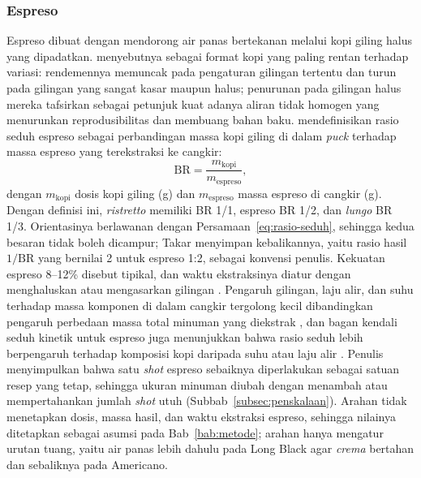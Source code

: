\subsubsection{Espreso}
\label{subsubsec:espreso}

Espreso dibuat dengan mendorong air panas bertekanan melalui kopi giling halus yang dipadatkan. \citet{cameron2020systematically} menyebutnya sebagai format kopi yang paling rentan terhadap variasi: rendemennya memuncak pada pengaturan gilingan tertentu dan turun pada gilingan yang sangat kasar maupun halus; penurunan pada gilingan halus mereka tafsirkan sebagai petunjuk kuat adanya aliran tidak homogen yang menurunkan reprodusibilitas dan membuang bahan baku. \citet*{schmieder2023influence} mendefinisikan rasio seduh espreso sebagai perbandingan massa kopi giling di dalam \textit{puck} terhadap massa espreso yang terekstraksi ke cangkir:
\begin{equation}
\mathrm{BR} = \frac{m_{\mathrm{kopi}}}{m_{\mathrm{espreso}}},
\label{eq:rasio-espreso}
\end{equation}
dengan $m_{\mathrm{kopi}}$ dosis kopi giling (g) dan $m_{\mathrm{espreso}}$ massa espreso di cangkir (g). Dengan definisi ini, \textit{ristretto} memiliki BR 1/1, espreso BR 1/2, dan \textit{lungo} BR 1/3. Orientasinya berlawanan dengan Persamaan~\eqref{eq:rasio-seduh}, sehingga kedua besaran tidak boleh dicampur; Takar menyimpan kebalikannya, yaitu rasio hasil $1/\mathrm{BR}$ yang bernilai 2 untuk espreso 1:2, sebagai konvensi penulis. Kekuatan espreso 8--12\% disebut tipikal, dan waktu ekstraksinya diatur dengan menghaluskan atau mengasarkan gilingan \citep{moroney2019analysing}. Pengaruh gilingan, laju alir, dan suhu terhadap massa komponen di dalam cangkir tergolong kecil dibandingkan pengaruh perbedaan massa total minuman yang diekstrak \citep*{schmieder2023influence}, dan bagan kendali seduh kinetik untuk espreso juga menunjukkan bahwa rasio seduh lebih berpengaruh terhadap komposisi kopi daripada suhu atau laju alir \citep*{pannusch2024modelbased}. Penulis menyimpulkan bahwa satu \textit{shot} espreso sebaiknya diperlakukan sebagai satuan resep yang tetap, sehingga ukuran minuman diubah dengan menambah atau mempertahankan jumlah \textit{shot} utuh (Subbab~\ref{subsec:penskalaan}). Arahan tidak menetapkan dosis, massa hasil, dan waktu ekstraksi espreso, sehingga nilainya ditetapkan sebagai asumsi pada Bab~\ref{bab:metode}; arahan hanya mengatur urutan tuang, yaitu air panas lebih dahulu pada Long Black agar \textit{crema} bertahan dan sebaliknya pada Americano.

